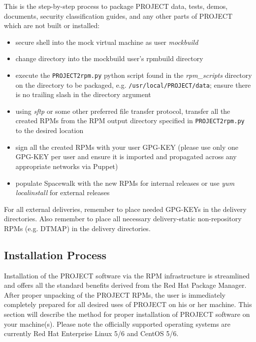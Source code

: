 \documentclass[12pt,letterpaper]{article}
\begin{document}
This is the step-by-step process to package PROJECT data, tests, demos, documents, security classification guides, and any other parts of PROJECT which are not built or installed:

\begin{itemize}
\item secure shell into the mock virtual machine as user \emph{mockbuild}
\item change directory into the mockbuild user's rpmbuild directory
\item execute the \verb|PROJECT2rpm.py| python script found in the \emph{rpm\_scripts} directory on the directory to be packaged, e.g. \linebreak\verb|/usr/local/PROJECT/data|; ensure there is no trailing slash in the directory argument
\item using \emph{sftp} or some other preferred file transfer protocol, transfer all the created RPMs from the RPM output directory specified in \linebreak\verb|PROJECT2rpm.py| to the desired location
\item sign all the created RPMs with your user GPG-KEY (please use only one GPG-KEY per user and ensure it is imported and propagated across any appropriate networks via Puppet)
\item populate Spacewalk with the new RPMs for internal releases or use \emph{yum localinstall} for external releases
\end{itemize}

For all external deliveries, remember to place needed GPG-KEYs in the delivery directories.  Also remember to place all necessary delivery-static non-repository RPMs (e.g. DTMAP) in the delivery directories.

\subsection{Installation Process}

Installation of the PROJECT software via the RPM infrastructure is streamlined and offers all the standard benefits derived from the Red Hat Package Manager.  After proper unpacking of the PROJECT RPMs, the user is immediately completely prepared for all desired uses of PROJECT on his or her machine.  This section will describe the method for proper installation of PROJECT software on your machine(s).  Please note the officially supported operating systems are currently Red Hat Enterprise Linux 5/6 and CentOS 5/6.
\end{document}
